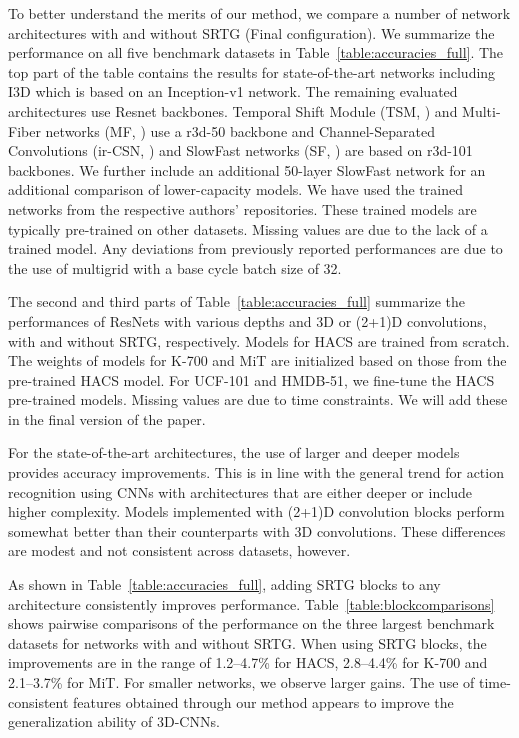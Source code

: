 \documentclass[final,5p,times,twocolumn]{elsarticle}
\begin{document}
To better understand the merits of our method, we compare a number of network architectures with and without SRTG (Final configuration). We summarize the performance on all five benchmark datasets in Table~\ref{table:accuracies_full}. The top part of the table contains the results for state-of-the-art networks including I3D \cite{carreira2017quo} which is based on an Inception-v1 network. The remaining evaluated architectures use Resnet backbones. Temporal Shift Module (TSM, \cite{lin2019tsm}) and Multi-Fiber networks (MF, \cite{chen2018multifiber}) use a r3d-50 backbone and Channel-Separated Convolutions (ir-CSN, \cite{tran2019video}) and SlowFast networks (SF, \cite{feichtenhofer2019slowfast}) are based on r3d-101 backbones. We further include an additional 50-layer SlowFast network for an additional comparison of lower-capacity models. We have used the trained networks from the respective authors' repositories. These trained models are typically pre-trained on other datasets. Missing values are due to the lack of a trained model. Any deviations from previously reported performances are due to the use of multigrid \citep{wu2019multigrid} with a base cycle batch size of 32.

The second and third parts of Table~\ref{table:accuracies_full} summarize the performances of ResNets with various depths and 3D or (2+1)D convolutions, with and without SRTG, respectively. Models for HACS are trained from scratch. The weights of models for K-700 and MiT are initialized based on those from the pre-trained HACS model. For UCF-101 and HMDB-51, we fine-tune the HACS pre-trained models. Missing values are due to time constraints. We will add these in the final version of the paper.


For the state-of-the-art architectures, the use of larger and deeper models provides accuracy improvements. This is in line with the general trend for action recognition using CNNs with architectures that are either deeper or include higher complexity. Models implemented with (2+1)D convolution blocks perform somewhat better than their counterparts with 3D convolutions. These differences are modest and not consistent across datasets, however.

As shown in Table~\ref{table:accuracies_full}, adding SRTG blocks to any architecture consistently improves performance. Table~\ref{table:blockcomparisons} shows pairwise comparisons of the performance on the three largest benchmark datasets for networks with and without SRTG. When using SRTG blocks, the improvements are in the range of 1.2--4.7\% for HACS, 2.8--4.4\% for K-700 and 2.1--3.7\% for MiT. For smaller networks, we observe larger gains. The use of time-consistent features obtained through our method appears to improve the generalization ability of 3D-CNNs.
\end{document}
